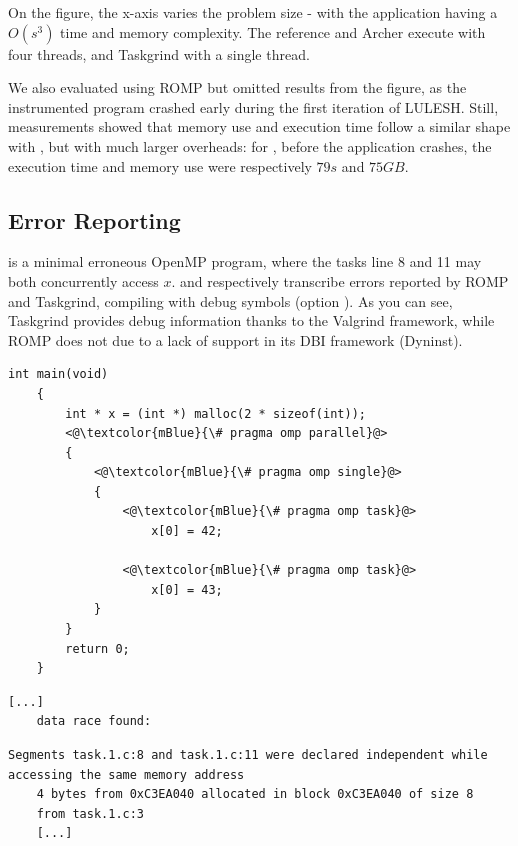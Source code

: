 On the figure, the x-axis varies the problem size  - with the application having a $O(s^3)$ time and memory complexity.
The reference and Archer execute with four threads, and Taskgrind with a single thread.

We also evaluated using ROMP but omitted results from the figure, as the instrumented program crashed early during the first iteration of LULESH.
Still, measurements showed that memory use and execution time follow a similar shape with , but with much larger overheads: for , before the application crashes, the execution time and memory use were respectively $79 s$ and $75GB$.


\subsection{Error Reporting}

 is a minimal erroneous OpenMP program, where the tasks line 8 and 11 may both concurrently access $x$.
 and  respectively transcribe errors reported by ROMP and Taskgrind, compiling with debug symbols (option ).
As you can see, Taskgrind provides debug information thanks to the Valgrind framework, while ROMP does not due to a lack of support in its DBI framework (Dyninst).

\begin{minipage}{\linewidth}
\begin{lstlisting}[style=CStyle, captionpos=b, caption={task.c - an errorneous OpenMP Program}, label={lst:error-report}]
	int main(void)
	{
		int * x = (int *) malloc(2 * sizeof(int));
		<@\textcolor{mBlue}{\# pragma omp parallel}@>
		{
			<@\textcolor{mBlue}{\# pragma omp single}@>
			{
				<@\textcolor{mBlue}{\# pragma omp task}@>
					x[0] = 42;
				
				<@\textcolor{mBlue}{\# pragma omp task}@>
					x[0] = 43;
			}
		}
		return 0;
	}
\end{lstlisting}
\end{minipage}

\begin{minipage}{\linewidth}
\begin{lstlisting}[style=text, captionpos=b, caption={An error report from ROMP}, label={lst:error-report-romp}]
	[...]
	data race found:
\end{lstlisting}
\end{minipage}

\begin{minipage}{\linewidth}
\begin{lstlisting}[style=text, captionpos=b, caption={An error report from Taskgrind}, label={lst:error-report-taskgrind}]
	Segments task.1.c:8 and task.1.c:11 were declared independent while accessing the same memory address
	4 bytes from 0xC3EA040 allocated in block 0xC3EA040 of size 8
	from task.1.c:3
	[...]
\end{lstlisting}
\end{minipage}



